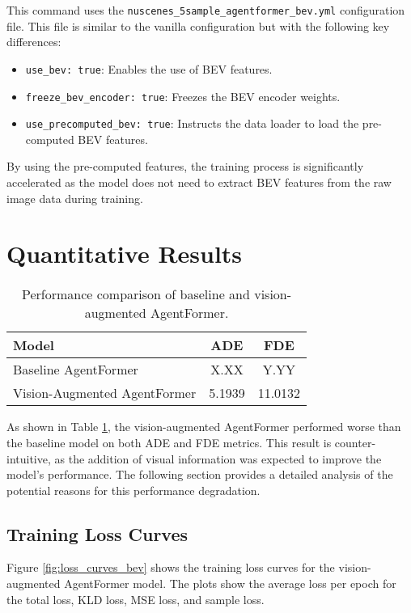 This command uses the \texttt{nuscenes\_5sample\_agentformer\_bev.yml} configuration file. This file is similar to the vanilla configuration but with the following key differences:

\begin{itemize}
    \item \texttt{use\_bev: true}: Enables the use of BEV features.
    \item \texttt{freeze\_bev\_encoder: true}: Freezes the BEV encoder weights.
    \item \texttt{use\_precomputed\_bev: true}: Instructs the data loader to load the pre-computed BEV features.
\end{itemize}

By using the pre-computed features, the training process is significantly accelerated as the model does not need to extract BEV features from the raw image data during training.

\section{Quantitative Results}

\begin{table}[h]
\centering
\caption{Performance comparison of baseline and vision-augmented AgentFormer.}
\label{tab:results}
\begin{tabular}{lcc}
\toprule
\textbf{Model} & \textbf{ADE} & \textbf{FDE} \\
\midrule
Baseline AgentFormer & X.XX & Y.YY \\
Vision-Augmented AgentFormer & 5.1939 & 11.0132 \\
\bottomrule
\end{tabular}
\end{table}

As shown in Table \ref{tab:results}, the vision-augmented AgentFormer performed worse than the baseline model on both ADE and FDE metrics. This result is counter-intuitive, as the addition of visual information was expected to improve the model's performance. The following section provides a detailed analysis of the potential reasons for this performance degradation.

\subsection{Training Loss Curves}

Figure \ref{fig:loss_curves_bev} shows the training loss curves for the vision-augmented AgentFormer model. The plots show the average loss per epoch for the total loss, KLD loss, MSE loss, and sample loss.

